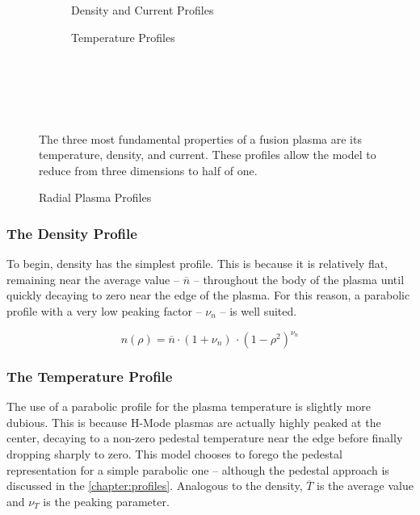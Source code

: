 \begin{figure*}
	\label{fig:profiles}
    \centering
    \hfill 
    \begin{subfigure}[t]{0.45\textwidth}
        \centering
		\begin{adjustbox}{width=\textwidth}
			\Large
			
		\end{adjustbox}
        \caption{Density and Current Profiles}
    \end{subfigure}
    \hfill
    \begin{subfigure}[t]{0.45\textwidth}
        \centering
		\begin{adjustbox}{width=\textwidth}
			\Large
			
		\end{adjustbox}
        \caption{Temperature Profiles}
    \end{subfigure}
    \hfill \hfill ~\\ ~\\ ~\\
    \caption{Radial Plasma Profiles} ~\\
    \small The three most fundamental properties of a fusion plasma are its temperature, density, and current. These profiles allow the model to reduce from three dimensions to half of one.
\end{figure*}

\subsubsection{The Density Profile}

To begin, density has the simplest profile. This is because it is relatively flat, remaining near the average value -- $\overline n$ -- throughout the body of the plasma until quickly decaying to zero near the edge of the plasma. For this reason, a parabolic profile with a very low peaking factor -- $\nu_n$ -- is well suited.

\begin{equation}
	n(\rho) = \overline n \cdot ( 1 + \nu_n ) \, \cdot ( 1 - \rho ^ 2 ) ^ {\nu_n}
\end{equation}

\subsubsection{The Temperature Profile}

The use of a parabolic profile for the plasma temperature is slightly more dubious. This is because H-Mode plasmas are actually highly peaked at the center, decaying to a non-zero pedestal temperature near the edge before finally dropping sharply to zero. This model chooses to forego the pedestal representation for a simple parabolic one -- although the pedestal approach is discussed in the \cref{chapter:profiles}. Analogous to the density, $\overline T$ is the average value and $\nu_T$ is the peaking parameter.

